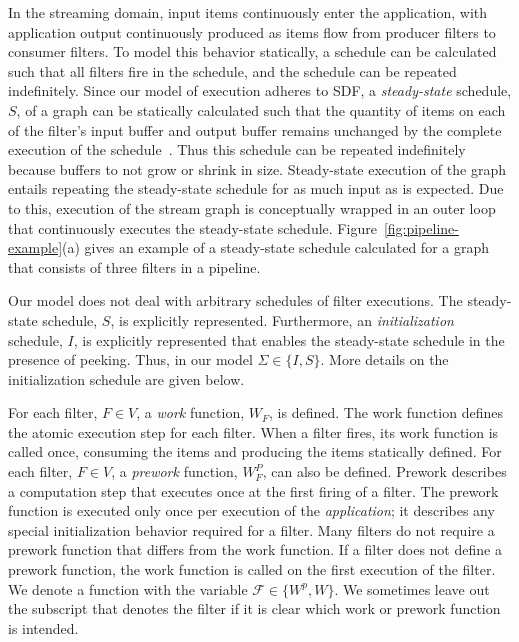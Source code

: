 In the streaming domain, input items continuously enter the
application, with application output continuously produced as items
flow from producer filters to consumer filters.  To model this
behavior statically, a schedule can be calculated such that all
filters fire in the schedule, and the schedule can be repeated
indefinitely.  Since our model of execution adheres to SDF, a {\it
  steady-state} schedule, $S$, of a graph can be statically calculated
such that the quantity of items on each of the filter's input buffer
and output buffer remains unchanged by the complete execution of the
schedule~\cite{lee87}.  Thus this schedule can be repeated
indefinitely because buffers to not grow or shrink in size.
Steady-state execution of the graph entails repeating the steady-state
schedule for as much input as is expected.  Due to this, execution of
the stream graph is conceptually wrapped in an outer loop that
continuously executes the steady-state schedule.
Figure~\ref{fig:pipeline-example}(a) gives an example of a
steady-state schedule calculated for a graph that consists of three
filters in a pipeline.

Our model does not deal with arbitrary schedules of filter executions.
The steady-state schedule, $S$, is explicitly represented.
Furthermore, an {\it initialization} schedule, $I$, is explicitly
represented that enables the steady-state schedule in the presence of
peeking.  Thus, in our model $\Sigma \in \{I, S\}$.  More details on
the initialization schedule are given below.

For each filter, $F \in V$, a {\it work} function, $W_F$, is defined.
The work function defines the atomic execution step for each filter.
When a filter fires, its work function is called once, consuming the
items and producing the items statically defined.  For each filter, $F
\in V$, a {\it prework} function, $W_F^P$, can also be defined.
Prework describes a computation step that executes once at the first
firing of a filter.  The prework function is executed only once per
execution of the {\it application}; it describes any special
initialization behavior required for a filter.  Many filters do not
require a prework function that differs from the work function.  If a
filter does not define a prework function, the work function is called
on the first execution of the filter.  We denote a function with the variable
$\mathcal{F} \in \{W^p, W\}$.   We sometimes leave out
the subscript that denotes the filter if it is clear which work or
prework function is intended.  

